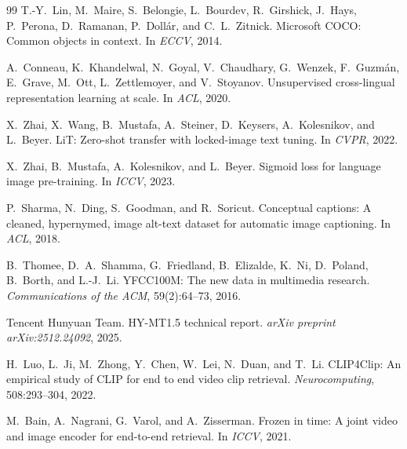 \documentclass[10pt,a4paper]{ctexart}
\begin{document}
\begin{thebibliography}{99}
T.-Y.~Lin, M.~Maire, S.~Belongie, L.~Bourdev, R.~Girshick, J.~Hays, P.~Perona, D.~Ramanan, P.~Dollár, and C.~L.~Zitnick.
\newblock Microsoft COCO: Common objects in context.
\newblock In \textit{ECCV}, 2014.

A.~Conneau, K.~Khandelwal, N.~Goyal, V.~Chaudhary, G.~Wenzek, F.~Guzmán, E.~Grave, M.~Ott, L.~Zettlemoyer, and V.~Stoyanov.
\newblock Unsupervised cross-lingual representation learning at scale.
\newblock In \textit{ACL}, 2020.

X.~Zhai, X.~Wang, B.~Mustafa, A.~Steiner, D.~Keysers, A.~Kolesnikov, and L.~Beyer.
\newblock LiT: Zero-shot transfer with locked-image text tuning.
\newblock In \textit{CVPR}, 2022.

X.~Zhai, B.~Mustafa, A.~Kolesnikov, and L.~Beyer.
\newblock Sigmoid loss for language image pre-training.
\newblock In \textit{ICCV}, 2023.

P.~Sharma, N.~Ding, S.~Goodman, and R.~Soricut.
\newblock Conceptual captions: A cleaned, hypernymed, image alt-text dataset for automatic image captioning.
\newblock In \textit{ACL}, 2018.

B.~Thomee, D.~A.~Shamma, G.~Friedland, B.~Elizalde, K.~Ni, D.~Poland, B.~Borth, and L.-J.~Li.
\newblock YFCC100M: The new data in multimedia research.
\newblock \textit{Communications of the ACM}, 59(2):64--73, 2016.

Tencent Hunyuan Team.
\newblock HY-MT1.5 technical report.
\newblock \textit{arXiv preprint arXiv:2512.24092}, 2025.

H.~Luo, L.~Ji, M.~Zhong, Y.~Chen, W.~Lei, N.~Duan, and T.~Li.
\newblock CLIP4Clip: An empirical study of CLIP for end to end video clip retrieval.
\newblock \textit{Neurocomputing}, 508:293--304, 2022.

M.~Bain, A.~Nagrani, G.~Varol, and A.~Zisserman.
\newblock Frozen in time: A joint video and image encoder for end-to-end retrieval.
\newblock In \textit{ICCV}, 2021.


\end{thebibliography}
\end{document}
